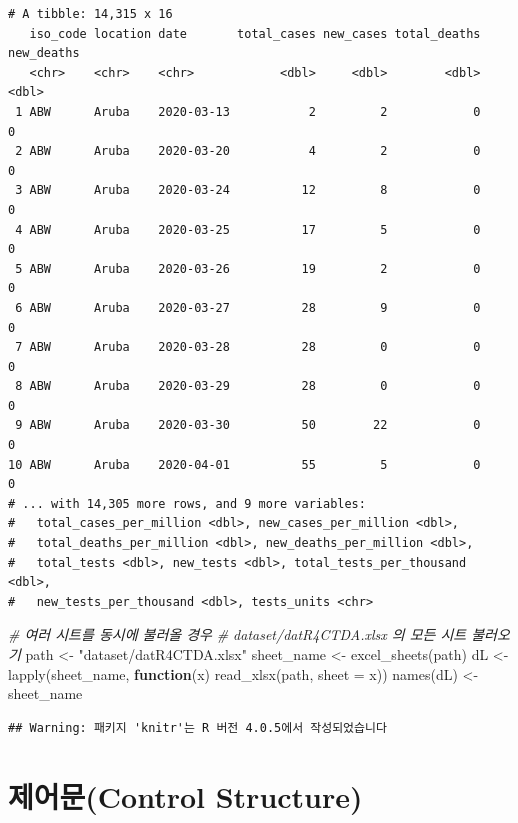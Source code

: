 \documentclass[
  11pt,
]{krantz}
\newenvironment{Shaded}{\begin{snugshade}}{\end{snugshade}}
\newcommand{\AttributeTok}[1]{\textcolor[rgb]{0.61,0.61,0.61}{#1}}
\newcommand{\CommentTok}[1]{\textcolor[rgb]{0.37,0.37,0.37}{\textit{#1}}}
\newcommand{\ControlFlowTok}[1]{\textcolor[rgb]{0.27,0.27,0.27}{\textbf{#1}}}
\newcommand{\FunctionTok}[1]{\textcolor[rgb]{0,0,0}{#1}}
\newcommand{\NormalTok}[1]{#1}
\newcommand{\OtherTok}[1]{\textcolor[rgb]{0.37,0.37,0.37}{#1}}
\newcommand{\StringTok}[1]{\textcolor[rgb]{0.5,0.5,0.5}{#1}}
\begin{document}
\begin{verbatim}
# A tibble: 14,315 x 16
   iso_code location date       total_cases new_cases total_deaths new_deaths
   <chr>    <chr>    <chr>            <dbl>     <dbl>        <dbl>      <dbl>
 1 ABW      Aruba    2020-03-13           2         2            0          0
 2 ABW      Aruba    2020-03-20           4         2            0          0
 3 ABW      Aruba    2020-03-24          12         8            0          0
 4 ABW      Aruba    2020-03-25          17         5            0          0
 5 ABW      Aruba    2020-03-26          19         2            0          0
 6 ABW      Aruba    2020-03-27          28         9            0          0
 7 ABW      Aruba    2020-03-28          28         0            0          0
 8 ABW      Aruba    2020-03-29          28         0            0          0
 9 ABW      Aruba    2020-03-30          50        22            0          0
10 ABW      Aruba    2020-04-01          55         5            0          0
# ... with 14,305 more rows, and 9 more variables:
#   total_cases_per_million <dbl>, new_cases_per_million <dbl>,
#   total_deaths_per_million <dbl>, new_deaths_per_million <dbl>,
#   total_tests <dbl>, new_tests <dbl>, total_tests_per_thousand <dbl>,
#   new_tests_per_thousand <dbl>, tests_units <chr>
\end{verbatim}

\begin{Shaded}
\begin{Highlighting}[]
\CommentTok{\# 여러 시트를 동시에 불러올 경우}
\CommentTok{\# dataset/datR4CTDA.xlsx 의 모든 시트 불러오기}
\NormalTok{path }\OtherTok{\textless{}{-}} \StringTok{"dataset/datR4CTDA.xlsx"}
\NormalTok{sheet\_name }\OtherTok{\textless{}{-}} \FunctionTok{excel\_sheets}\NormalTok{(path)}
\NormalTok{dL }\OtherTok{\textless{}{-}} \FunctionTok{lapply}\NormalTok{(sheet\_name, }\ControlFlowTok{function}\NormalTok{(x) }\FunctionTok{read\_xlsx}\NormalTok{(path, }\AttributeTok{sheet =}\NormalTok{ x))}
\FunctionTok{names}\NormalTok{(dL) }\OtherTok{\textless{}{-}}\NormalTok{ sheet\_name}
\end{Highlighting}
\end{Shaded}

\normalsize

\begin{verbatim}
## Warning: 패키지 'knitr'는 R 버전 4.0.5에서 작성되었습니다
\end{verbatim}

\hypertarget{control-structure}{%
\chapter{제어문(Control Structure)}\label{control-structure}}
\end{document}
